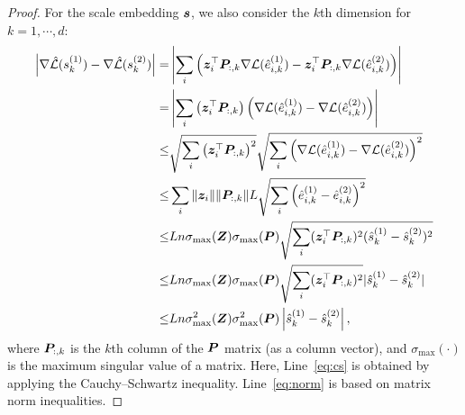 \begin{proof}
 For the scale embedding ${\bm{s}}$, we also consider the $k$th dimension for $k=1,\cdots, d$: \begin{align}
        \left|\nabla \hat{{\mathcal{L}}}(s_k^{(1)}) - \nabla \hat{{\mathcal{L}}}(s_k^{(2)})\right|
        =& \left| \sum_i \left({\bm{z}}_i^\top {\bm{P}}_{:,k} \nabla {\mathcal{L}}(\hat e_{i,k}^{(1)}) - {\bm{z}}_i^\top{\bm{P}}_{:,k}  \nabla {\mathcal{L}}(\hat e_{i,k}^{(2)})  \right) \right| \\
        =&  \left|\sum_i \left( {\bm{z}}_i^\top {\bm{P}}_{:,k} \right) \left(\nabla {\mathcal{L}}(\hat e_{i,k}^{(1)}) - \nabla {\mathcal{L}}(\hat e_{i,k}^{(2)})  \right)\right| \\
        \le&  \sqrt{\sum_i \left( {\bm{z}}_i^\top {\bm{P}}_{:,k} \right)^2} \sqrt{\sum_i \left(\nabla {\mathcal{L}}(\hat e_{i,k}^{(1)}) - \nabla {\mathcal{L}}(\hat e_{i,k}^{(2)}) \right)^2 } \label{eq:cs}\\
        \le& \sum_i\|{\bm{z}}_i\| \|{\bm{P}}_{:,k}\| L \sqrt{\sum_i \left(\hat e_{i,k}^{(1)} - \hat e_{i,k}^{(2)}\right)^2} \\
        \le& L n  \sigma_{\max}({\bm{Z}}) \sigma_{\max}({\bm{P}}) \sqrt{\sum_i  ({\bm{z}}_i^\top {\bm{P}}_{:,k})^2 (\hat s_{k}^{(1)} - \hat s_{k}^{(2)})^2 } 
        \label{eq:norm}\\
        \le& L n  \sigma_{\max}({\bm{Z}}) \sigma_{\max}({\bm{P}}) \sqrt{\sum_i  ({\bm{z}}_i^\top {\bm{P}}_{:,k})^2} |\hat s_{k}^{(1)} - \hat s_{k}^{(2)}|  \\
        \le&  L n \sigma_{\max}^2({\bm{Z}}) \sigma_{\max}^2({\bm{P}}) \left| \hat s_{k}^{(1)} - \hat s_{k}^{(2)}\right|,
    \end{align}
where ${\bm{P}}_{:,k}$ is the $k$th column of the ${\bm{P}}$ matrix (as a column vector), and $\sigma_{\max}(\cdot)$ is the maximum singular value of a matrix. Here, Line~\eqref{eq:cs} is obtained by applying the  Cauchy--Schwartz inequality. Line~\eqref{eq:norm} is based on matrix norm inequalities. 
    

\end{proof}
